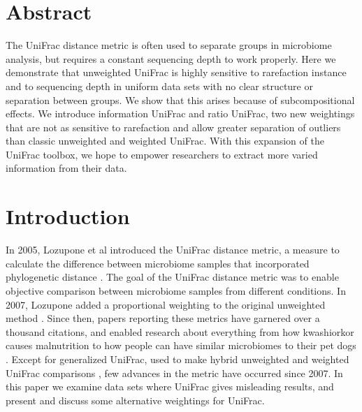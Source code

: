 \documentclass[10pt,letterpaper]{article}
\begin{document}
\section*{Abstract}
The UniFrac distance metric is often used to separate groups in microbiome analysis, but requires a constant sequencing depth to work properly. Here we demonstrate that unweighted UniFrac is highly sensitive to rarefaction instance and to sequencing depth in uniform data sets with no clear structure or separation between groups. We show that this arises because of subcompositional effects. We introduce information UniFrac and ratio UniFrac, two new weightings that are not as sensitive to rarefaction and allow greater separation of outliers than classic unweighted and weighted UniFrac. With this expansion of the UniFrac toolbox, we hope to empower researchers to extract more varied information from their data.


\linenumbers

\section*{Introduction}
In 2005, Lozupone et al introduced the UniFrac distance metric, a measure to calculate the difference between microbiome samples that incorporated phylogenetic distance \cite{lozupone2005unifrac}. The goal of the UniFrac distance metric was to enable objective comparison between microbiome samples from different conditions. In 2007, Lozupone added a proportional weighting to the original unweighted method \cite{lozupone2007quantitative}. Since then, papers reporting these metrics have garnered over a thousand citations, and enabled research about everything from how kwashiorkor causes malnutrition \cite{smith2013gut} to how people can have similar microbiomes to their pet dogs \cite{song2013cohabiting}. Except for generalized UniFrac, used to make hybrid unweighted and weighted UniFrac comparisons \cite{chen2012associating}, few advances in the metric have occurred since 2007. In this paper we examine data sets where UniFrac gives misleading results, and present and discuss some alternative weightings for UniFrac.
\end{document}
